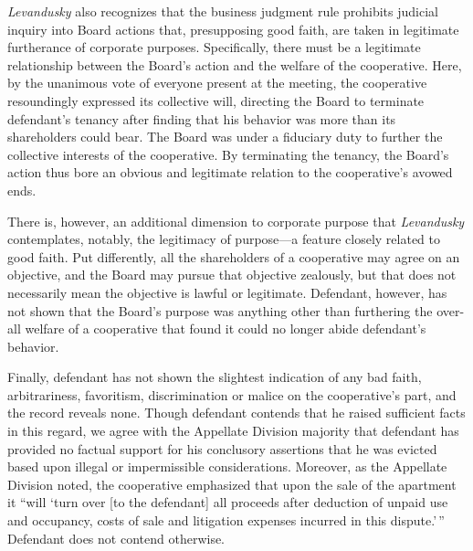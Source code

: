 
\textit{Levandusky} also recognizes that the business judgment rule prohibits
judicial inquiry into Board actions that, presupposing good faith, are taken in
legitimate furtherance of corporate purposes. Specifically, there must be a
legitimate relationship between the Board's action and the welfare of the
cooperative. Here, by the unanimous vote of everyone present at the meeting, the
cooperative resoundingly expressed its collective will, directing the Board to
terminate defendant's tenancy after finding that his behavior was more than its
shareholders could bear. The Board was under a fiduciary duty to further the
collective interests of the cooperative. By terminating the tenancy, the Board's
action thus bore an obvious and legitimate relation to the cooperative's avowed
ends.

There is, however, an additional dimension to corporate purpose that
\textit{Levandusky} contemplates, notably, the legitimacy of purpose---a feature
closely related to good faith. Put differently, all the shareholders of a
cooperative may agree on an objective, and the Board may pursue that objective
zealously, but that does not necessarily mean the objective is lawful or
legitimate. Defendant, however, has not shown that the Board's purpose was
anything other than furthering the over-all welfare of a cooperative that found
it could no longer abide defendant's behavior. 



Finally, defendant has not shown the slightest indication of any bad faith,
arbitrariness, favoritism, discrimination or malice on the cooperative's part,
and the record reveals none. Though defendant contends that he raised sufficient
facts in this regard, we agree with the Appellate Division majority that
defendant has provided no factual support for his conclusory assertions that he
was evicted based upon illegal or impermissible considerations. Moreover, as the
Appellate Division noted, the cooperative emphasized that upon the sale of the
apartment it ``will `turn over [to the defendant] all proceeds after deduction
of unpaid use and occupancy, costs of sale and litigation expenses incurred in
this dispute.'\,'' Defendant does not contend otherwise.

